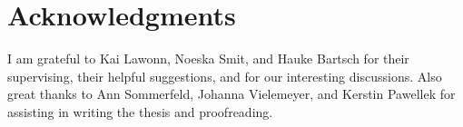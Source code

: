 \documentclass[crop=false]{standalone}
\begin{document}


  \section*{Acknowledgments}
  \thispagestyle{empty}
  I am grateful to Kai Lawonn, Noeska Smit, and Hauke Bartsch for their supervising, their helpful suggestions, and for our interesting discussions.
  Also great thanks to Ann Sommerfeld, Johanna Vielemeyer, and Kerstin Pawellek for assisting in writing the thesis and proofreading.
  \restoregeometry
\end{document}
